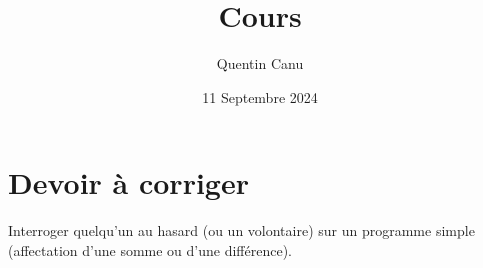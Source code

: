 \documentclass{article}
\title{Cours}
\date{11 Septembre 2024}
\author{Quentin Canu}
\begin{document}
\maketitle

\section{Devoir à corriger}
Interroger quelqu'un au hasard (ou un volontaire) sur un programme simple (affectation d'une somme ou d'une différence).
\end{document}
